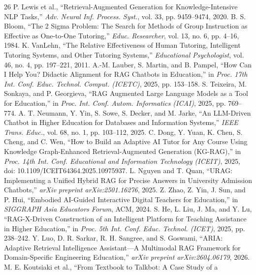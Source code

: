 \documentclass[conference]{IEEEtran}
\begin{document}
\begin{thebibliography}{26}
P. Lewis et al., ``Retrieval-Augmented Generation for Knowledge-Intensive
NLP Tasks,'' \textit{Adv. Neural Inf. Process. Syst.}, vol. 33,
pp. 9459--9474, 2020.
B. S. Bloom, ``The 2 Sigma Problem: The Search for Methods of Group
Instruction as Effective as One-to-One Tutoring,'' \textit{Educ.
Researcher}, vol. 13, no. 6, pp. 4--16, 1984.
K. VanLehn, ``The Relative Effectiveness of Human Tutoring, Intelligent
Tutoring Systems, and Other Tutoring Systems,'' \textit{Educational
Psychologist}, vol. 46, no. 4, pp. 197--221, 2011.
A.-M. Lauber, S. Martin, and B. Pampel, ``How Can I Help You? Didactic
Alignment for RAG Chatbots in Education,'' in \textit{Proc. 17th Int.
Conf. Educ. Technol. Comput. (ICETC)}, 2025, pp. 153--158.
S. Teixeira, M. Sonkaya, and P. Georgieva, ``RAG Augmented Large
Language Models as a Tool for Education,'' in \textit{Proc. Int. Conf.
Autom. Informatics (ICAI)}, 2025, pp. 769--774.
A. T. Neumann, Y. Yin, S. Sowe, S. Decker, and M. Jarke,
``An LLM-Driven Chatbot in Higher Education for Databases and
Information Systems,'' \textit{IEEE Trans. Educ.}, vol. 68, no. 1,
pp. 103--112, 2025.
C. Dong, Y. Yuan, K. Chen, S. Cheng, and C. Wen, ``How to Build an
Adaptive AI Tutor for Any Course Using Knowledge Graph-Enhanced
Retrieval-Augmented Generation (KG-RAG),''
in \textit{Proc. 14th Int. Conf. Educational and Information Technology
(ICEIT)}, 2025, doi: 10.1109/ICEIT64364.2025.10975937.
L. Nguyen and T. Quan, ``URAG: Implementing a Unified Hybrid RAG for
Precise Answers in University Admission Chatbots,''
\textit{arXiv preprint arXiv:2501.16276}, 2025.
Z. Zhao, Z. Yin, J. Sun, and P. Hui, ``Embodied AI-Guided Interactive
Digital Teachers for Education,'' in \textit{SIGGRAPH Asia Educators
Forum}, ACM, 2024.
S. He, L. Liu, J. Ma, and Y. Lu, ``RAG-X-Driven Construction of an
Intelligent Platform for Teaching Assistance in Higher Education,''
in \textit{Proc. 5th Int. Conf. Educ. Technol. (ICET)}, 2025,
pp. 238--242.
Y. Luo, D. R. Sarkar, R. H. Sangree, and S. Goswami,
``ARIA: Adaptive Retrieval Intelligence Assistant---A Multimodal RAG
Framework for Domain-Specific Engineering Education,''
\textit{arXiv preprint arXiv:2604.06179}, 2026.
M. E. Koutsiaki et al., ``From Textbook to Talkbot: A Case Study of a

\end{thebibliography}
\end{document}

